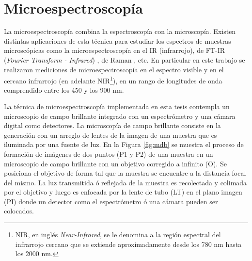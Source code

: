 
\singlespacing
\section{Microespectroscopía}
\label{sec:microespp}


\hspace{0.5cm}La microespectroscopía combina la espectroscopía con la microscopía. Existen distintas aplicaciones de esta técnica para estudiar los espectros de muestras microscópicas como la microespectroscopía en el IR (infrarrojo)\cite{WALSH20071}, de FT-IR (\textit{Fourier Transform - Infrared}) \cite{kani}, de Raman \cite{defaria}, etc. En particular en este trabajo se realizaron mediciones de microespectroscopía en el espectro visible y en el cercano infrarrojo (en adelante NIR\footnote{NIR, en inglés \textit{Near-Infrared}, se le denomina a la región espectral del infrarrojo cercano que se extiende aproximadamente desde los 780 nm hasta los 2000 nm.}), en un rango de longitudes de onda comprendido entre los 450 y los 900 nm.

La técnica de microespectroscopía implementada en esta tesis contempla un microscopio de campo brillante integrado con un espectrómetro y una cámara digital como detectores. La microscopía de campo brillante consiste en la generación con un arreglo de lentes de la imagen de una muestra que es iluminada por una fuente de luz. En la Figura \ref{fig:mdb} se muestra el proceso de formación de imágenes de dos puntos (P1 y P2) de una muestra en un microscopio de campo brillante con un objetivo corregido a infinito (O). Se posiciona el objetivo de forma tal que la muestra se encuentre a la distancia focal del mismo. La luz transmitida ó reflejada de la muestra es recolectada y colimada por el objetivo y luego es enfocada por la lente de tubo (LT) en el plano imagen (PI) donde un detector como el espectrómetro ó una cámara pueden ser colocados.

